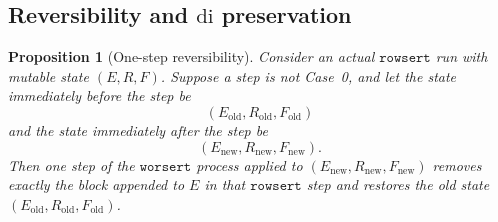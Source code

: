 \documentclass[11pt]{article}
\theoremstyle{plain}
\newtheorem{proposition}[theorem]{Proposition}
\theoremstyle{definition}
\theoremstyle{remark}
\newcommand{\di}{\mathrm{di}}
\newcommand{\rowsert}{\texttt{rowsert}}
\newcommand{\worsert}{\texttt{worsert}}
\begin{document}
\subsection{\texorpdfstring{Reversibility and \(\di\) preservation}{Reversibility and di preservation}}
\begin{proposition}[One-step reversibility]
\label{prop:rowsert-one-step-reversibility}
Consider an actual \(\rowsert\) run with mutable state \((E,R,F)\).  Suppose a
step is not Case~0, and let the state immediately before the step be
\[
  (E_{\mathrm{old}},R_{\mathrm{old}},F_{\mathrm{old}})
\]
and the state immediately after the step be
\[
  (E_{\mathrm{new}},R_{\mathrm{new}},F_{\mathrm{new}}).
\]
Then one step of the \(\worsert\) process applied to
\((E_{\mathrm{new}},R_{\mathrm{new}},F_{\mathrm{new}})\) removes exactly the
block appended to \(E\) in that \(\rowsert\) step and restores the old state
\((E_{\mathrm{old}},R_{\mathrm{old}},F_{\mathrm{old}})\).
\end{proposition}
\end{document}
